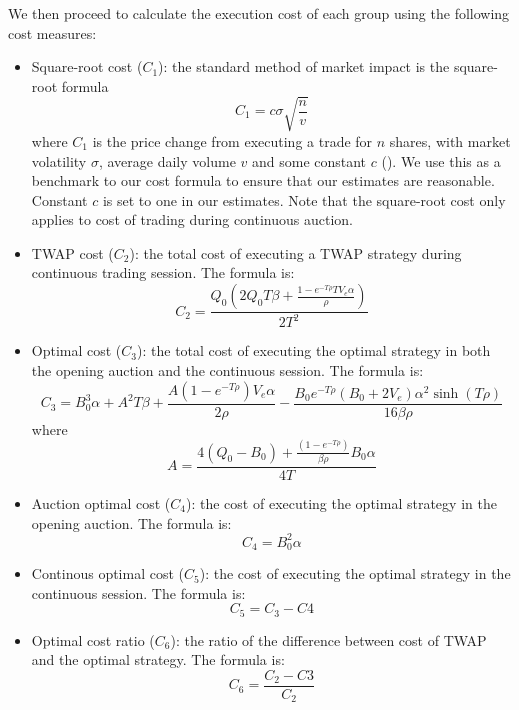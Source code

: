 We then proceed to calculate the execution cost of each group using the following cost measures:
\begin{itemize}
  \item Square-root cost ($C_1$): the standard method of market impact is the square-root formula
        \[
          C_1 = c \sigma \sqrt{\frac{n}{v}}
        \]
        where $C_1$ is the price change from executing a trade for $n$ shares, with market volatility $\sigma$, average daily volume $v$ and some constant $c$ (\cite{Toth2011}). We use this as a benchmark to our cost formula to ensure that our estimates are reasonable. Constant $c$ is set to one in our estimates. Note that the square-root cost only applies to cost of trading during continuous auction.
  \item TWAP cost ($C_2$): the total cost of executing a TWAP strategy during continuous trading session. The formula is:
        \[
          C_2 = \frac{Q_0 (2 Q_0 T \beta + \frac{1-e^{-T \rho} T V_e \alpha}{\rho})}{2 T^2}
        \]
  \item Optimal cost ($C_3$): the total cost of executing the optimal strategy in both the opening auction and the continuous session. The formula is:
        \[
          C_3 = B_0^3 \alpha + A^2 T \beta + \frac{A (1-e^{-T \rho}) V_e \alpha}{2 \rho} - \frac{B_0 e^{-T \rho} (B_0 + 2 V_e) \alpha^2 \sinh(T \rho)}{16 \beta \rho}
        \]
        where
        \[
          A =   \frac{4 (Q_0 - B_0) + \frac{(1 - e^{-T \rho})}{\beta \rho} B_0 \alpha} {4 T}
        \]
  \item Auction optimal cost ($C_4$): the cost of executing the optimal strategy in the opening auction. The formula is:
        \[
          C_4 = B_0^2 \alpha
        \]
  \item Continous optimal cost ($C_5$): the cost of executing the optimal strategy in the continuous session. The formula is:
        \[
          C_5 = C_3 - C4
        \]
  \item Optimal cost ratio ($C_6$): the ratio of the difference between cost of TWAP and the optimal strategy. The formula is:
        \[
          C_6 = \frac{C_2 - C3}{C_2}
        \]
\end{itemize}

